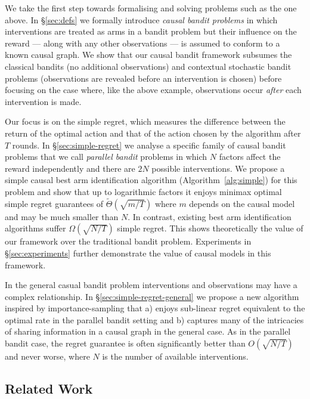 We take the first step towards formalising and solving problems such as the one above. 
In \S\ref{sec:defs} we formally introduce \emph{causal bandit problems} in which interventions are treated as arms in a bandit problem but their influence on the reward --- along with any other observations --- is assumed to conform to a known causal graph. 
We show that our causal bandit framework subsumes the classical bandits (no additional observations) and contextual stochastic bandit problems (observations are revealed before an intervention is chosen) before focusing on the case where, like the above example, observations occur \emph{after} each intervention is made.

Our focus is on the simple regret, which measures the difference between the return of the optimal action and that of the action chosen by the algorithm after $T$ rounds.
In \S\ref{sec:simple-regret} we analyse a specific family of causal bandit problems that we call \emph{parallel bandit} problems in which $N$ factors affect the reward independently and there are $2N$ possible interventions.
We propose a simple causal best arm identification algorithm (Algorithm~\ref{alg:simple}) for this problem and show that up to logarithmic factors it enjoys minimax optimal
simple regret guarantees of $\tilde\Theta(\sqrt{m/T})$ where $m$ depends on the causal model and may be much smaller than $N$.
In contrast, existing best arm identification algorithms suffer $\Omega(\sqrt{N/T})$ simple regret.
This shows theoretically the value of our framework over the traditional bandit problem. 
Experiments in \S\ref{sec:experiments} further demonstrate the value of causal models in this framework.

In the general casual bandit problem interventions and observations may have a complex relationship. 
In \S\ref{sec:simple-regret-general} we propose a new algorithm inspired by importance-sampling that a) enjoys sub-linear regret equivalent to the optimal rate in the parallel bandit setting and b) captures many of the intricacies of sharing information in a causal graph in the general case.
As in the parallel bandit case, the regret guarantee is often significantly better than $O(\sqrt{N/T})$ and never worse, where $N$ is the number of available interventions.



\subsection{Related Work}

